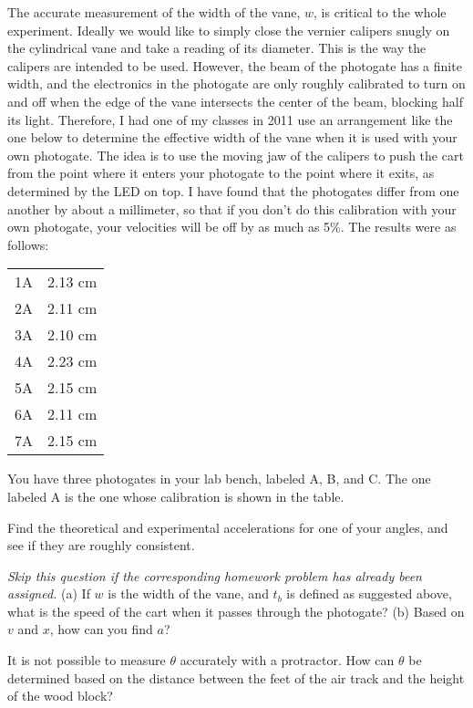 The accurate measurement of the width of the vane, $w$, is critical
to the whole experiment.
Ideally we would like to simply close the vernier calipers snugly on the
cylindrical vane and take a reading of its diameter. This is the way the
calipers are intended to be used. However, the beam of the photogate
has a finite width, and the electronics in the photogate are only roughly
calibrated to turn on and off when the edge of the vane intersects the
center of the beam, blocking half its light. Therefore, I had one of my classes in 2011 use
an arrangement like the one below to determine the effective width of the
vane when it is used with your own photogate. The idea is to use the moving jaw of the calipers
to push the cart from the point where it enters your photogate to the point
where it exits, as determined by the LED on top. I have found that the
photogates differ from one another by about a millimeter, so that if you
don't do this calibration with your own photogate, your velocities will be
off by as much as 5\%. The results were as follows:

\noindent \begin{tabular}{ll}
1A & 2.13 cm \\
2A & 2.11 cm \\
3A & 2.10 cm \\
4A & 2.23 cm \\
5A & 2.15 cm \\
6A & 2.11 cm \\
7A & 2.15 cm
\end{tabular}

\noindent You have three photogates in your lab bench, labeled A, B, and C.
The one labeled A is the one whose calibration is shown in the table.


\selfcheck

Find the theoretical and experimental accelerations for one
of your angles, and see if they are roughly consistent.

\prelab

\prelabquestion   \emph{Skip this question if the corresponding homework problem
has already been assigned.} (a) If $w$ is the width of the vane, and $t_b$ is defined
as suggested above, what is the speed of the cart when it
passes through the photogate? 
(b) Based on $v$ and $x$, how can you find $a$?

\prelabquestion  It is not possible to measure $\theta $ accurately with
a protractor.  How can $\theta $ be determined based on the
distance between the feet of the air track and the
height of the wood block?

